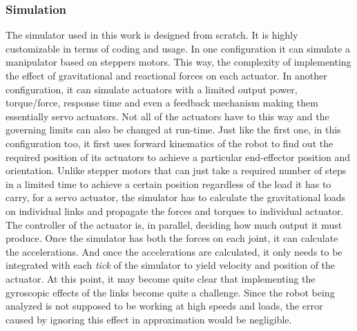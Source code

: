 {    \subsubsection{Simulation}
    The simulator used in this work is designed from scratch. It is highly customizable in terms of coding and usage. In one configuration it can simulate a manipulator based on steppers motors. This way, the complexity of implementing the effect of gravitational and reactional forces on each actuator. In another configuration, it can simulate actuators with a limited output power, torque/force, response time and even a feedback mechanism making them essentially servo actuators. Not all of the actuators have to this way and the governing limits can also be changed at run-time. Just like the first one, in this configuration too, it first uses forward kinematics of the robot to find out the required position of its actuators to achieve a particular end-effector position and orientation. Unlike stepper motors that can just take a required number of steps in a limited time to achieve a certain position regardless of the load it has to carry, for a servo actuator, the simulator has to calculate the gravitational loads on individual links and propagate the forces and torques to individual actuator. The controller of the actuator is, in parallel, deciding how much output it must produce. Once the simulator has both the forces on each joint, it can calculate the accelerations. And once the accelerations are calculated, it only needs to be integrated with each \emph{tick} of the simulator to yield velocity and position of the actuator. At this point, it may become quite clear that implementing the gyroscopic effects of the links become quite a challenge. Since the robot being analyzed is not supposed to be working at high speeds and loads, the error caused by ignoring this effect in approximation would be negligible.

}
